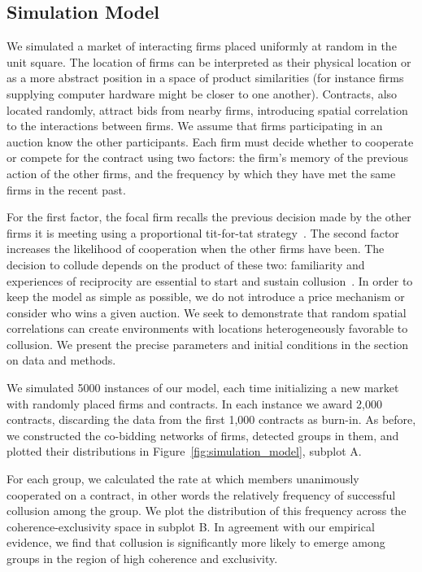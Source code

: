\subsection{Simulation Model}
We simulated a market of interacting firms placed uniformly at random in the unit square. The location of firms can be interpreted as their physical location or as a more abstract position in a space of product similarities (for instance firms supplying computer hardware might be closer to one another). Contracts, also located randomly, attract bids from nearby firms, introducing spatial correlation to the interactions between firms. We assume that firms participating in an auction know the other participants. Each firm must decide whether to cooperate or compete for the contract using two factors: the firm's memory of the previous action of the other firms, and the frequency by which they have met the same firms in the recent past.

For the first factor, the focal firm recalls the previous decision made by the other firms it is meeting using a proportional tit-for-tat strategy~\cite{axelrod1981evolution}. The second factor increases the likelihood of cooperation when the other firms have been. The decision to collude depends on the product of these two: familiarity and experiences of reciprocity are essential to start and sustain collusion~\cite{hilbe2018partners}. In order to keep the model as simple as possible, we do not introduce a price mechanism or consider who wins a given auction. We seek to demonstrate that random spatial correlations can create environments with locations heterogeneously favorable to collusion. We present the precise parameters and initial conditions in the section on data and methods.

We simulated 5000 instances of our model, each time initializing a new market with randomly placed firms and contracts. In each instance we award 2,000 contracts, discarding the data from the first 1,000 contracts as burn-in. As before, we constructed the co-bidding networks of firms, detected groups in them, and plotted their distributions in Figure~\ref{fig:simulation_model}, subplot A.

For each group, we calculated the rate at which members unanimously cooperated on a contract, in other words the relatively frequency of successful collusion among the group. We plot the distribution of this frequency across the coherence-exclusivity space in subplot B. In agreement with our empirical evidence, we find that collusion is significantly more likely to emerge among groups in the region of high coherence and exclusivity.

